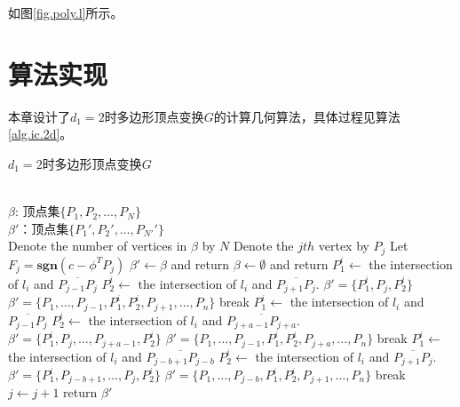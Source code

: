 如图\ref{fig.poly.l}所示。

\section{算法实现}\label{sect:3.3}
本章设计了$d_{1}=2$时多边形顶点变换$G$的计算几何算法，具体过程见算法\ref{alg.ic.2d}。

\begin{algo}%
\caption{$d_{1}=2$时多边形顶点变换$G$}
\label{alg.ic.2d}
\begin{algorithmic}
\REQUIRE\\
$\beta$: 顶点集$\{P_{1},P_{2},\ldots,P_{N}\}$\\
\ENSURE
$\beta'$：顶点集$\{P_{1}',P_{2}',\ldots,P_{N'}'\}$\\
\STATE Denote the number of vertices in $\beta$ by $N$
	\STATE Denote the $jth$ vertex by $P_{j}$
	\STATE Let $F_{j}=\mathbf{sgn}(c-\phi^{T}P_{j})$
\ENDFOR
{}
	\STATE $\beta'\leftarrow\beta$ and return
	\STATE $\beta\leftarrow\emptyset$ and return
\ENDIF
{}
		\STATE $P_{1}^{i}\leftarrow$ the intersection of $l_{i}$ and $\overline{P_{j-1}P_{j}}$
		\STATE $P_{2}^{i}\leftarrow$ the intersection of $l_{i}$ and $\overline{P_{j+1}P_{j}}$.
			\STATE$\beta'=\{P_{1}^{i},P_{j},P_{2}^{i}\}$
		\ELSE
			\STATE$\beta'=\{P_{1},\ldots,P_{j-1},P_{1}^{i},P_{2}^{i},P_{j+1},\ldots,P_{n}\}$
		\ENDIF
        \STATE break
		\STATE $P_{1}^{i}\leftarrow$ the intersection of $l_{i}$ and $\overline{P_{j-1}P_{j}}$
		\STATE $P_{2}^{i}\leftarrow$ the intersection of $l_{i}$ and $\overline{P_{j+a-1}P_{j+a}}$.
			\STATE$\beta'=\{P_{1}^{i},P_{j},\ldots,P_{j+a-1},P_{2}^{i}\}$
		\ELSE
			\STATE$\beta'=\{P_{1},\ldots,P_{j-1},P_{1}^{i},P_{2}^{i},P_{j+a},\ldots,P_{n}\}$
		\ENDIF
        \STATE break
		\STATE $P_{1}^{i}\leftarrow$ the intersection of $l_{i}$ and $\overline{P_{j-b+1}P_{j-b}}$
		\STATE $P_{2}^{i}\leftarrow$ the intersection of $l_{i}$ and $\overline{P_{j+1}P_{j}}$.
			\STATE$\beta'=\{P_{1}^{i},P_{j-b+1},\ldots,P_{j},P_{2}^{i}\}$
		\ELSE
			\STATE$\beta'=\{P_{1},\ldots,P_{j-b},P_{1}^{i},P_{2}^{i},P_{j+1},\ldots,P_{n}\}$
		\ENDIF
        \STATE break
    \ENDIF
	\STATE $j\leftarrow j+1$
\ENDFOR
\STATE return $\beta'$
\end{algorithmic}
\end{algo}
